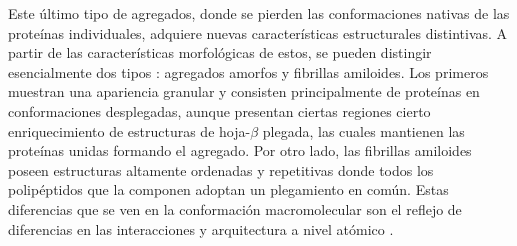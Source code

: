 Este último tipo de agregados, donde se pierden las conformaciones nativas de las proteínas individuales, adquiere nuevas características estructurales distintivas.
A partir de las características morfológicas de estos, se pueden distingir esencialmente dos tipos \cite{rousseau2006protein}: agregados amorfos y fibrillas amiloides.
Los primeros muestran una apariencia granular y consisten principalmente de proteínas en conformaciones desplegadas, aunque presentan ciertas regiones cierto enriquecimiento de estructuras de hoja-$\beta$ plegada, las cuales
mantienen las proteínas unidas formando el agregado.
Por otro lado, las fibrillas amiloides poseen estructuras altamente ordenadas y repetitivas donde todos los polipéptidos que la componen adoptan un plegamiento en común.
Estas diferencias que se ven en la conformación macromolecular son el reflejo de diferencias en las interacciones y arquitectura a nivel atómico \cite{makin2005molecular}.





